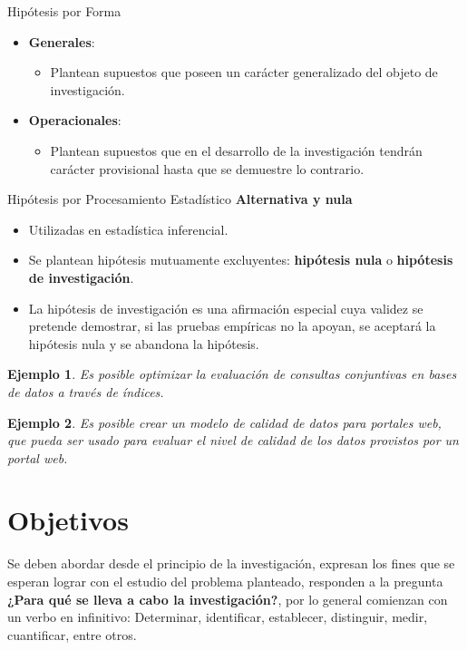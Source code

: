 \documentclass[letter,12pt]{report}
\newtheorem{ejemplo}{Ejemplo}
\newcommand\naranjo[1]{\textcolor[rgb]{1.00,0.36,0.06}{\textbf{#1}}}
\begin{document}
Hipótesis por Forma
\begin{itemize}
  \item \textbf{Generales}:
  \begin{itemize}
  \item Plantean supuestos que poseen un carácter generalizado del objeto de investigación.
\end{itemize}

  \item \textbf{Operacionales}:
  \begin{itemize}
  \item Plantean supuestos que en el desarrollo de la investigación tendrán carácter provisional hasta que se demuestre lo contrario.
\end{itemize}

\end{itemize}

Hipótesis por Procesamiento Estadístico
\textbf{Alternativa y nula}
 \begin{itemize}\justifying
  \item Utilizadas en estadística inferencial.
  \item Se plantean hipótesis mutuamente excluyentes: \naranjo{hipótesis nula} o \naranjo{hipótesis de investigación}.
  \item La hipótesis de investigación es una afirmación especial cuya validez se pretende demostrar, si las pruebas empíricas no la apoyan, se aceptará la hipótesis nula y se abandona la hipótesis.
\end{itemize}

\begin{ejemplo}
  Es posible optimizar la evaluación de consultas conjuntivas en bases de datos a través de índices.
\end{ejemplo}

\begin{ejemplo}
  Es posible crear un modelo de calidad de datos para portales web, que pueda ser usado para evaluar el nivel de calidad de los datos provistos por un portal web.
\end{ejemplo}

\section{Objetivos}\label{objetivos}

Se deben abordar desde el principio de la investigación, expresan los fines que se esperan lograr con el estudio del problema planteado, responden a la pregunta \naranjo{¿Para qué se lleva a cabo la investigación?}, por lo general comienzan con un verbo en infinitivo: Determinar, identificar, establecer, distinguir, medir, cuantificar, entre otros.
\end{document}
